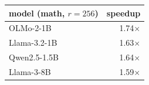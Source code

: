 \begin{tabular}{lr}
\toprule
model (math, $r{=}256$) & speedup \\
\midrule
OLMo-2-1B & 1.74$\times$ \\
Llama-3.2-1B & 1.63$\times$ \\
Qwen2.5-1.5B & 1.64$\times$ \\
Llama-3-8B & 1.59$\times$ \\
\bottomrule
\end{tabular}
